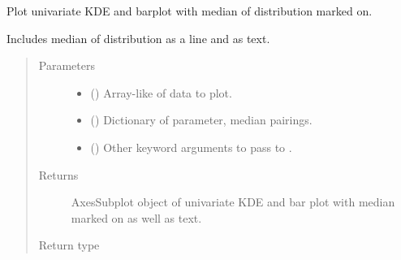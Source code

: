 \documentclass[letterpaper,10pt,english]{sphinxmanual}
\begin{document}
\begin{fulllineitems}
\label{\detokenize{misc:bayescmd.results_handling.diag_kde_plot}}
Plot univariate KDE and barplot with median of distribution marked on.

Includes median of distribution as a line and as text.
\begin{quote}\begin{description}
\item[{Parameters}] \leavevmode\begin{itemize}
\item {} 
 () \textendash{} Array-like of data to plot.

\item {} 
 () \textendash{} Dictionary of parameter, median pairings.

\item {} 
 (\sphinxstyleliteralemphasis{, }) \textendash{} Other keyword arguments to pass to .

\end{itemize}

\item[{Returns}] \leavevmode
{} \textendash{} AxesSubplot object of univariate KDE and bar plot with median marked
on as well as text.

\item[{Return type}] \leavevmode
{}

\end{description}\end{quote}

\end{fulllineitems}

\end{document}
